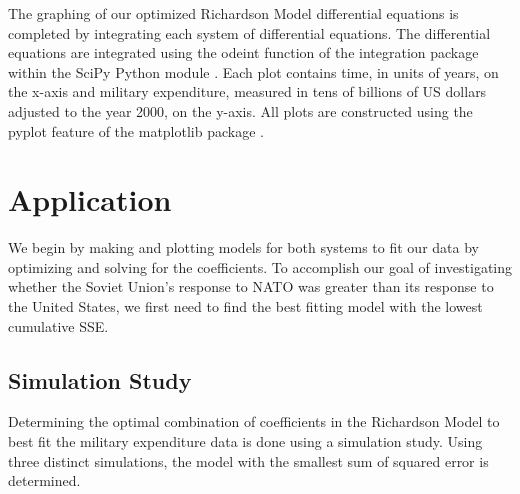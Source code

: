\documentclass[12pt, centerh1]{article}
\begin{document}
The graphing of our optimized Richardson Model differential equations is completed by integrating each system of differential equations. The differential equations are integrated using the odeint function of the integration package within the SciPy Python module \citep{2020SciPy-NMeth}. Each plot contains time, in units of years, on the x-axis and military expenditure, measured in tens of billions of US dollars adjusted to the year 2000, on the y-axis. All plots are constructed using the pyplot feature of the matplotlib package \citep{Hunter:2007}.


\section{Application}
We begin by making and plotting models for both systems to fit our data by optimizing and solving for the coefficients. To accomplish our goal of investigating whether the Soviet Union’s response to NATO was greater than its response to the United States, we first need to find the best fitting model with the lowest cumulative SSE. 



\subsection{Simulation Study}

Determining the optimal combination of coefficients in the Richardson Model to best fit the military expenditure data is done using a simulation study. Using three distinct simulations, the model with the smallest sum of squared error is determined. 
\end{document}
